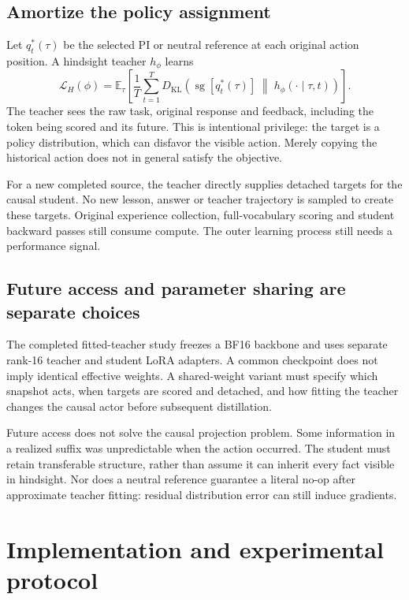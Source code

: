 \documentclass[11pt,letterpaper]{article}
\newcommand{\KL}{D_{\mathrm{KL}}}
\newcommand{\sg}{\operatorname{sg}}
\begin{document}
\subsection{Amortize the policy assignment}

Let $q_t^*(\tau)$ be the selected PI or neutral reference at each original action position. A hindsight teacher $h_\phi$ learns
\begin{equation}
\mathcal L_H(\phi)
=\mathbb E_\tau\!\left[
\frac1T\sum_{t=1}^{T}
\KL\!\left(\sg[q_t^*(\tau)]\;\middle\|\;h_\phi(\cdot\mid\tau,t)\right)
\right].
\label{eq:hindsight}
\end{equation}
The teacher sees the raw task, original response and feedback, including the token being scored and its future. This is intentional privilege: the target is a policy distribution, which can disfavor the visible action. Merely copying the historical action does not in general satisfy the objective.

For a new completed source, the teacher directly supplies detached targets for the causal student. No new lesson, answer or teacher trajectory is sampled to create these targets. Original experience collection, full-vocabulary scoring and student backward passes still consume compute. The outer learning process still needs a performance signal.

\subsection{Future access and parameter sharing are separate choices}

The completed fitted-teacher study freezes a BF16 backbone and uses separate rank-16 teacher and student LoRA adapters. A common checkpoint does not imply identical effective weights. A shared-weight variant must specify which snapshot acts, when targets are scored and detached, and how fitting the teacher changes the causal actor before subsequent distillation.

Future access does not solve the causal projection problem. Some information in a realized suffix was unpredictable when the action occurred. The student must retain transferable structure, rather than assume it can inherit every fact visible in hindsight. Nor does a neutral reference guarantee a literal no-op after approximate teacher fitting: residual distribution error can still induce gradients.

\section{Implementation and experimental protocol}
\end{document}
